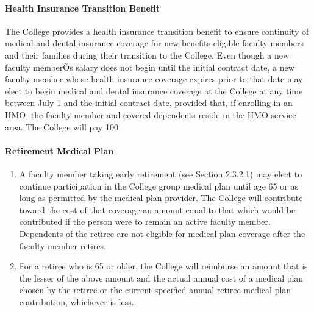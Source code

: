 \documentclass[letterpaper, 11pt]{article}
\begin{document}
			\paragraph{Health Insurance Transition Benefit}
				The College provides a health insurance transition benefit to ensure continuity of medical and dental insurance coverage for new benefits-eligible faculty members and their families during their transition to the College.  Even though a new faculty memberÕs salary does not begin until the initial contract date, a new faculty member whose health insurance coverage expires prior to that date may elect to begin medical and dental insurance coverage at the College at any time between July 1 and the initial contract date, provided that, if enrolling in an HMO, the faculty member and covered dependents reside in the HMO service area.  The College will pay 100%
			\paragraph{Retirement Medical Plan}
				\begin{enumerate}[label=\alph*)]
					\item{A faculty member taking early retirement (see Section 2.3.2.1) may elect to continue participation in the College group medical plan until age 65 or as long as permitted by the medical plan provider.  The College will contribute toward the cost of that coverage an amount equal to that which would be contributed if the person were to remain an active faculty member.  Dependents of the retiree are not eligible for medical plan coverage after the faculty member retires.}
					\item{For a retiree who is 65 or older, the College will reimburse an amount that is the lesser of the above amount and the actual annual cost of a medical plan chosen by the retiree or the current specified annual retiree medical plan contribution, whichever is less.}
				\end{enumerate}
\end{document}
